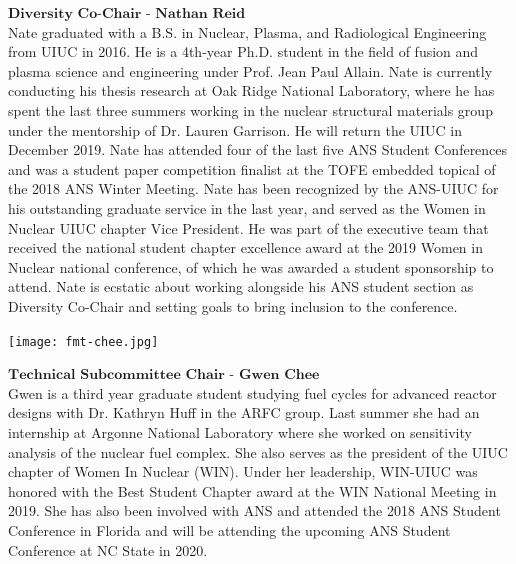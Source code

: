 \begin{minipage}{0.73\textwidth}
$\textbf{Diversity Co-Chair - Nathan Reid}$\\
	Nate graduated with a B.S. in Nuclear, Plasma, and Radiological Engineering from UIUC in 2016. He is a 4th-year Ph.D. student in the field of fusion and plasma science and engineering under Prof. Jean Paul Allain. Nate is currently conducting his thesis research at Oak Ridge National Laboratory, where he has spent the last three summers working in the nuclear structural materials group under the mentorship of Dr. Lauren Garrison. He will return the UIUC in December 2019. Nate has attended four of the last five ANS Student Conferences and was a student paper competition finalist at the TOFE embedded topical of the 2018 ANS Winter Meeting. Nate has been recognized by the ANS-UIUC for his outstanding graduate service in the last year, and served as the Women in Nuclear UIUC chapter Vice President. He was part of the executive team that received the national student chapter excellence award at the 2019 Women in Nuclear national conference, of which he was awarded a student sponsorship to attend. Nate is ecstatic about working alongside his ANS student section as Diversity Co-Chair and setting goals to bring inclusion to the conference.
\end{minipage}

\begin{minipage}{0.25\textwidth}
	\centering
	\texttt{[image: fmt-chee.jpg]}
\end{minipage}
\begin{minipage}{0.73\textwidth}
$\textbf{Technical Subcommittee Chair - Gwen Chee}$\\
	Gwen is a third year graduate student studying fuel cycles for advanced reactor designs with Dr. Kathryn Huff in the ARFC group. Last summer she had an internship at Argonne National Laboratory where she worked on sensitivity analysis of the nuclear fuel complex. She also serves as the president of the UIUC chapter of Women In Nuclear (WIN). Under her leadership, WIN-UIUC was honored with the Best Student Chapter award at the WIN National Meeting in 2019. She has also been involved with ANS and attended the 2018 ANS Student Conference in Florida and will be attending the upcoming ANS Student Conference at NC State in 2020.
\end{minipage}

